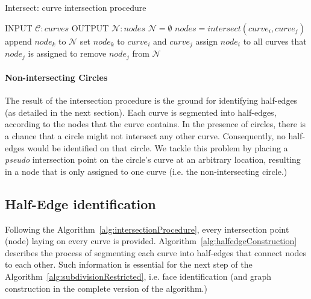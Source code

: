 \begin{algorithm}
  \caption {Intersect: curve intersection procedure}
  \label{alg:intersectionProcedure}
  \begin{algorithmic}    
    \STATE INPUT  $\mathcal{C}:curves$
    \STATE OUTPUT  $\mathcal{N}:nodes$
    \STATE \quad
    \STATE $\mathcal{N} = \emptyset$
    \STATE $nodes=intersect\left( curve_i, curve_j \right) $
    \STATE append $node_k$ to $\mathcal{N}$
    \STATE set $node_k$ to $curve_i$ and $curve_j$
    \ENDFOR
    \ENDFOR
    \STATE \quad
    \STATE assign $node_i$ to all curves that $node_j$ is assigned to
    \STATE remove $node_j$ from $\mathcal{N}$
    \ENDFOR
  \end{algorithmic}
\end{algorithm}

\paragraph{Non-intersecting Circles}
The result of the intersection procedure is the ground for identifying half-edges (as detailed in the next section).
Each curve is segmented into half-edges, according to the nodes that the curve contains.
In the presence of circles, there is a chance that a circle might not intersect any other curve.
Consequently, no half-edges would be identified on that circle.
We tackle this problem by placing a \emph{pseudo} intersection point on the circle's curve at an arbitrary location, resulting in a node that is only assigned to one curve (i.e. the non-intersecting circle.)

\subsection{Half-Edge identification} \label{subsec:halfEdgeConstruction}

Following the Algorithm~\ref{alg:intersectionProcedure}, every intersection point (node) laying on every curve is provided.
Algorithm~\ref{alg:halfedgeConstruction} describes the process of segmenting each curve into half-edges that connect nodes to each other.
Such information is essential for the next step of the Algorithm~\ref{alg:subdivisionRestricted}, i.e. face identification (and graph construction in the complete version of the algorithm.)\bigskip

